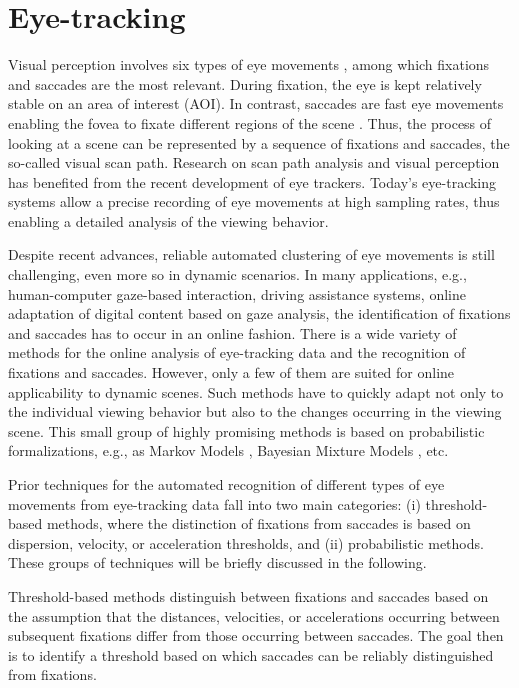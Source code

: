 \documentclass[preprint,12pt]{elsarticle}
\begin{document}
\section{Eye-tracking}
\label{sec:eye_tracking}

Visual perception involves six types of eye movements \cite{leigh2015neurology}, among which fixations and saccades are the most relevant.
During fixation, the eye is kept relatively stable on an area of interest (AOI). In contrast, saccades are fast eye movements enabling the fovea to fixate different regions of the scene \cite{privitera:2005:scanpath_theory}.
Thus, the process of looking at a scene can be represented by a sequence of fixations and saccades, the so-called visual scan path.
Research on scan path analysis and visual perception has benefited from the recent development of eye trackers.
Today’s eye-tracking systems allow a precise recording of eye movements at high sampling rates, thus enabling a detailed analysis of the viewing behavior.

Despite recent advances, reliable automated clustering of eye movements is still challenging, even more so in dynamic scenarios.
In many applications, e.g., human-computer gaze-based interaction, driving assistance systems, online adaptation of digital content based on gaze analysis, the identification of fixations and saccades has to occur in an online fashion.
There is a wide variety of methods for the online analysis of eye-tracking data and the recognition of fixations and saccades.
However, only a few of them are suited for online applicability to dynamic scenes.
Such methods have to quickly adapt not only to the individual viewing behavior but also to the changes occurring in the viewing scene.
This small group of highly promising methods is based on probabilistic formalizations, e.g.,
as Markov Models \cite{Salvucci:2000:IFS:355017.355028, Komogortsev2013},
Bayesian Mixture Models \cite{Tafaj:2012:BOC:2168556.2168617}, etc.

Prior techniques for the automated recognition of different types of eye movements from eye-tracking data fall into two main categories:
(i) threshold-based methods, where the distinction of fixations from saccades is based on dispersion, velocity, or acceleration thresholds, and
(ii) probabilistic methods. These groups of techniques will be briefly discussed in the following.

Threshold-based methods distinguish between fixations and saccades based on the assumption that the distances, velocities, or accelerations occurring between subsequent fixations differ from those occurring between saccades.
The goal then is to identify a threshold based on which saccades can be reliably distinguished from fixations.
\end{document}

